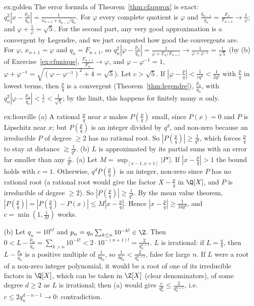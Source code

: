 \begin{solution}{ex:golden}
\idea The error formula of Theorem~\ref{thm:cfapprox} is exact: $q_n^2\left|x-\frac{p_n}{q_n}\right|=\frac1{x_{n+1}+q_{n-1}/q_n}$. For $\varphi$ every complete quotient is $\varphi$ and $\frac{q_{n-1}}{q_n}=\frac{F_n}{F_{n+1}}\to\frac1\varphi$; and $\varphi+\frac1\varphi=\sqrt5$. For the second part, any very good approximation is a convergent by Legendre, and we just computed how good the convergents are.
\writeup For $\varphi$, $x_{n+1}=\varphi$ and $q_n=F_{n+1}$, so $q_n^2\left|\varphi-\frac{p_n}{q_n}\right|=\frac1{\varphi+F_n/F_{n+1}}\to\frac1{\varphi+\varphi^{-1}}=\frac1{\sqrt5}$ (by (b) of Exercise~\ref{ex:cfunique}, $\frac{F_{n+1}}{F_n}\to\varphi$, and $\varphi-\varphi^{-1}=1$, $\varphi+\varphi^{-1}=\sqrt{(\varphi-\varphi^{-1})^2+4}=\sqrt5$). Let $c>\sqrt5$. If $\left|\varphi-\frac pq\right|<\frac1{cq^2}<\frac1{2q^2}$ with $\frac pq$ in lowest terms, then $\frac pq$ is a convergent (Theorem~\ref{thm:legendre}), $\frac{p_n}{q_n}$, with $q_n^2\left|\varphi-\frac{p_n}{q_n}\right|<\frac1c<\frac1{\sqrt5}$; by the limit, this happens for finitely many $n$ only.
\end{solution}

\begin{solution}{ex:liouville}
\idea (a) A rational $\frac pq$ near $x$ makes $P(\frac pq)$ small, since $P(x)=0$ and $P$ is Lipschitz near $x$; but $P(\frac pq)$ is an integer divided by $q^d$, and non-zero because an irreducible $P$ of degree $\ge2$ has no rational root. So $|P(\frac pq)|\ge\frac1{q^d}$, which forces $\frac pq$ to stay at distance $\gtrsim\frac1{q^d}$. (b) $L$ is approximated by its partial sums with an error far smaller than any $\frac c{q^d}$.
\writeup (a) Let $M=\sup_{[x-1,x+1]}|P'|$. If $\left|x-\frac pq\right|>1$ the bound holds with $c=1$. Otherwise, $q^dP(\frac pq)$ is an integer, non-zero since $P$ has no rational root (a rational root would give the factor $X-\frac pq$ in $\Q[X]$, and $P$ is irreducible of degree $\ge2$). So $\left|P(\frac pq)\right|\ge\frac1{q^d}$. By the mean value theorem, $\left|P(\frac pq)\right|=\left|P(\frac pq)-P(x)\right|\le M\left|x-\frac pq\right|$. Hence $\left|x-\frac pq\right|\ge\frac1{Mq^d}$, and $c=\min(1,\frac1M)$ works.

(b) Let $q_n=10^{n!}$ and $p_n=q_n\sum_{k\le n}10^{-k!}\in\Z$. Then $0<L-\frac{p_n}{q_n}=\sum_{k>n}10^{-k!}<2\cdot10^{-(n+1)!}=\frac2{q_n^{n+1}}$. $L$ is irrational: if $L=\frac ab$, then $L-\frac{p_n}{q_n}$ is a positive multiple of $\frac1{bq_n}$, so $\frac1{bq_n}<\frac2{q_n^{n+1}}$, false for large $n$. If $L$ were a root of a non-zero integer polynomial, it would be a root of one of its irreducible factors in $\Q[X]$, which can be taken in $\Z[X]$ (clear denominators), of some degree $d\ge2$ as $L$ is irrational; then (a) would give $\frac c{q_n^d}\le\frac2{q_n^{n+1}}$, i.e.\ $c\le2q_n^{d-n-1}\to0$: contradiction.
\end{solution}

